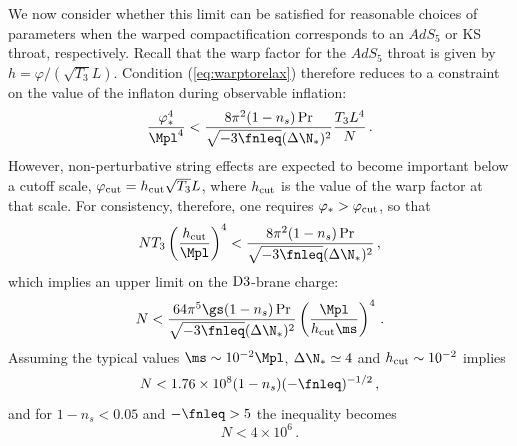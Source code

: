 We now consider whether this limit can be satisfied for reasonable choices 
of parameters when the warped compactification corresponds to 
an $AdS_5$ or KS throat, respectively. Recall that the warp 
factor for the $AdS_5$ throat is given by $h=\varphi/(\sqrt{T_3}L)$.  
Condition (\ref{eq:warptorelax}) therefore reduces to a constraint on the 
value of the inflaton during observable inflation: 
% 
\begin{equation}
\label{eq:phivalue-dbi}
\frac{\varphi_*^4}{\Mpl^4} < 
\frac{8\pi^2 (1-n_s)\Pr}{\sqrt{-3\fnleq} ( \Delta \N_*)^2} 
\frac{T_3 L^4}{N} \,.
\end{equation}
%  
However, non-perturbative string effects are expected to become 
important below a cutoff scale, $\varphi_{\rm cut} = 
h_{\rm cut} \sqrt{T_3} L$, where $h_{\rm cut}$ is the value of the 
warp factor at that scale. For consistency, therefore, one requires 
$\varphi_*>\varphi_{\rm cut}$, so that 
% 
\begin{equation}
 N T_3 \left(\frac{h_\mathrm{cut} }{\Mpl}\right)^4 < 
\frac{8\pi^2 (1-n_s)\Pr}{\sqrt{-3\fnleq} ( \Delta \N_*)^2} \,,
\end{equation}
% 
which implies an upper limit on the 
${\rm D3}$-brane charge: 
% 
\begin{equation}
\label{eq:Nlimit-dbi}
N< \frac{64\pi^5 \gs (1-n_s)\Pr}{\sqrt{-3\fnleq} ( \Delta \N_*)^2}
\left( \frac{\Mpl}{h_{\rm cut} \ms} \right)^4   \,.
\end{equation}
% 
Assuming the typical values $\ms \sim 10^{-2}\Mpl$, 
$\Delta \N_* \simeq 4$ and 
$h_{\rm cut} \sim 10^{-2}$ implies
%   
\begin{equation}
N < 1.76 \times 10^8 (1-n_s)(-\fnleq)^{-1/2} \,, 
\end{equation}
% 
and for $1-n_s <0.05$ and $-\fnleq>5$ the inequality becomes
% 
\begin{equation}
 N < 4\times 10^6\,.
\end{equation}
%  


